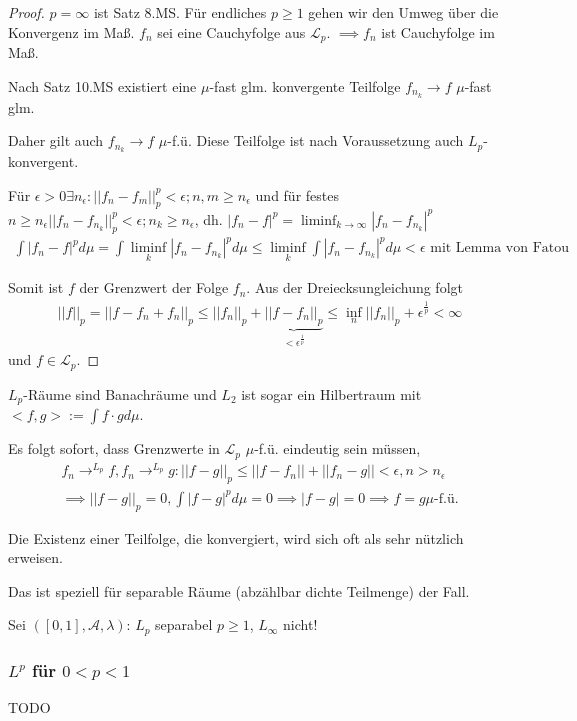 \documentclass[]{article}
\begin{document}
\begin{proof}
	$p=\infty$ ist Satz 8.MS. Für endliches $p\geq 1$ gehen wir den Umweg über die Konvergenz im Maß. $f_n$ sei eine Cauchyfolge aus $\mathcal{L}_p$. $\implies f_n$ ist Cauchyfolge im Maß.
	
	Nach Satz 10.MS existiert eine $\mu$-fast glm. konvergente Teilfolge $f_{n_k} \rightarrow f$ $\mu$-fast glm.
	
	Daher gilt auch $f_{n_k}\rightarrow f$ $\mu$-f.ü. Diese Teilfolge ist nach Voraussetzung auch $L_p$-konvergent.
	
	Für $\epsilon > 0 \exists n_{\epsilon}: ||f_n-f_m||_p^p < \epsilon; n,m\geq n_\epsilon$ und für festes $n \geq n_\epsilon ||f_n-f_{n_k}||_p^p < \epsilon; n_k\geq n_\epsilon$, dh. $|f_n-f|^p = \liminf_{k\rightarrow\infty} |f_n-f_{n_k}|^p$
	\begin{align*}
		\int |f_n - f|^p d\mu = \int \liminf_k |f_n - f_{n_k}|^p d\mu \leq \liminf_k \int |f_n - f_{n_k}|^p d\mu < \epsilon \text{ mit Lemma von Fatou}
	\end{align*}
	
	Somit ist $f$ der Grenzwert der Folge $f_n$. Aus der Dreiecksungleichung folgt
	\begin{align*}
		||f||_p = ||f-f_n+f_n||_p \leq ||f_n||_p + \underbrace{||f-f_n||_p}_{<\epsilon^{\frac{1}{p}}} \leq \inf_n ||f_n||_p + \epsilon^{\frac{1}{p}} < \infty
	\end{align*}
	und $f\in\mathcal{L}_p$.
\end{proof}

$L_p$-Räume sind Banachräume und $L_2$ ist sogar ein Hilbertraum mit $<f,g> := \int f\cdot g d\mu$.

Es folgt sofort, dass Grenzwerte in $\mathcal{L}_p$ $\mu$-f.ü. eindeutig sein müssen,
\begin{align*}
	f_n \rightarrow^{L_p} f, f_n \rightarrow^{L_p} g : ||f-g||_p \leq ||f-f_n|| + ||f_n - g|| < \epsilon, n > n_\epsilon\\
	\implies ||f-g||_p = 0, \int |f-g|^p d\mu = 0 \implies |f-g|=0 \implies f=g \mu\text{-f.ü.}
\end{align*}

Die Existenz einer Teilfolge, die konvergiert, wird sich oft als sehr nützlich erweisen.

Das ist speziell für separable Räume (abzählbar dichte Teilmenge) der Fall.

Sei $([0,1], \mathcal{A}, \lambda)$: $L_p$ separabel $p\geq 1$, $L_\infty$ nicht!

\subsubsection{$L^p$ für $0<p<1$}
TODO
\end{document}
